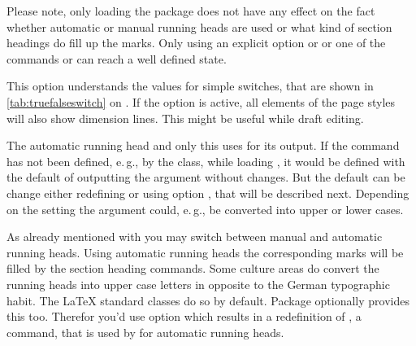   Please note, only loading the package does not have any
  effect on the fact whether automatic or manual running heads are used or
  what kind of section headings do fill up the marks. Only using an explicit
  option  or  or one of the commands
   or  can reach a well defined state.%
  \EndIndexGroup


  \begin{Declaration}
  \end{Declaration}
  This \KOMAScript{} option understands the values for simple switches, that
  are shown in \autoref{tab:truefalseswitch} on
  . If the option is active, all elements of
  the page styles will also show dimension lines. This might be useful while
  draft editing.%
  \EndIndexGroup

  \begin{Declaration}
  \end{Declaration}
  The automatic running head and only this uses  for its
  output. If the command has not been defined, e.\,g., by the class, while
  loading , it would be defined with the default of
  outputting the argument  without changes. But the default can
  be change either redefining  or using option
  , that will be described next.
  Depending on the setting the argument could, e.\,g., be converted into upper
  or lower cases.
  \EndIndexGroup


  \begin{Declaration}
  \end{Declaration}
  As already mentioned with  you may switch between manual
  and automatic running heads. Using automatic running heads the corresponding
  marks will be filled by the section heading commands. Some culture areas do
  convert the running heads into upper case letters in opposite to the German
  typographic habit. The \LaTeX{} standard classes do so by default. Package
   optionally provides this too. Therefor you'd use option
   which results in a redefinition of
  , a
  command, that is used by  for automatic running heads.

